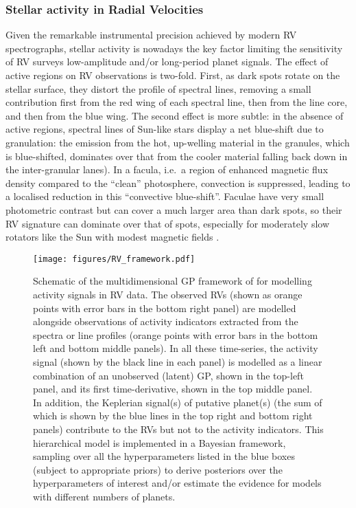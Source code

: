 \documentclass[letterpaper]{ar-1col}
\begin{document}
\subsubsection{Stellar activity in Radial Velocities} \label{sec:RVact}
Given the remarkable instrumental precision achieved by modern RV spectrographs, stellar activity is nowadays the key factor limiting the sensitivity of RV surveys low-amplitude and/or long-period planet signals. The effect of active regions on RV observations is two-fold. First, as dark spots rotate on the stellar surface, they distort the profile of spectral lines, removing a small contribution first from the red wing of each spectral line, then from the line core, and then from the blue wing. The second effect is more subtle: in the absence of active regions, spectral lines of Sun-like stars display a net blue-shift due to granulation: the emission from the hot, up-welling material in the granules, which is blue-shifted, dominates over that from the cooler material falling back down in the inter-granular lanes). In a facula, i.e.\ a region of enhanced magnetic flux density compared to the ``clean'' photosphere, convection is suppressed, leading to a localised reduction in this ``convective blue-shift''. Faculae have very small photometric contrast but can cover a much larger area than dark spots, so their RV signature can dominate over that of spots, especially for moderately slow rotators like the Sun with modest magnetic fields \citep{2010A&A...512A..39M}.

\begin{figure}[ht]
  \texttt{[image: figures/RV\_framework.pdf]}
  \caption{Schematic of the multidimensional GP framework of \citet{2015MNRAS.452.2269R} for modelling activity signals in RV data. The observed RVs (shown as orange points with error bars in the bottom right panel) are modelled alongside observations of activity indicators extracted from the spectra or line profiles (orange points with error bars in the bottom left and bottom middle panels). In all these time-series, the activity signal (shown by the black line in each panel) is modelled as a linear combination of an unobserved (latent) GP, shown in the top-left panel, and its first time-derivative, shown in the top middle panel. In addition, the Keplerian signal(s) of putative planet(s) (the sum of which is shown by the blue lines in the top right and bottom right panels) contribute to the RVs but not to the activity indicators. This hierarchical model is implemented in a Bayesian framework, sampling over all the hyperparameters listed in the blue boxes (subject to appropriate priors) to derive posteriors over the hyperparameters of interest and/or estimate the evidence for models with different numbers of planets. }
  \label{fig:RV_framework}
\end{figure}
\end{document}
